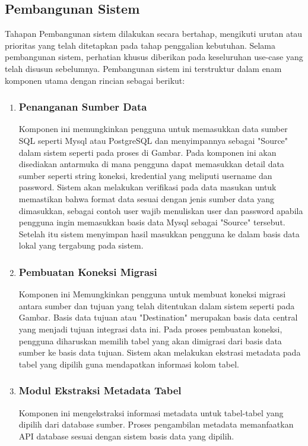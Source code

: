 \subsection{Pembangunan Sistem}
Tahapan Pembangunan sistem dilakukan secara bertahap, mengikuti urutan atau prioritas yang telah ditetapkan pada tahap penggalian kebutuhan. Selama pembangunan sistem, perhatian khusus diberikan pada keseluruhan use-case yang telah disusun sebelumnya. Pembangunan sistem ini terstruktur dalam enam komponen utama dengan rincian sebagai berikut:
\begin{enumerate}
  \item \subsubsection*{Penanganan Sumber Data}
  Komponen ini memungkinkan pengguna untuk memasukkan data sumber SQL seperti Mysql atau PostgreSQL dan menyimpannya sebagai "Source" dalam sistem seperti pada proses di Gambar. Pada komponen ini akan disediakan antarmuka di mana pengguna dapat memasukkan detail data sumber seperti string koneksi, kredential yang meliputi username dan password. Sistem akan melakukan verifikasi pada data masukan untuk memastikan bahwa format data sesuai dengan jenis sumber data yang dimasukkan, sebagai contoh user wajib menuliskan user dan password apabila pengguna ingin memasukkan basis data Mysql sebagai "Source" tersebut. Setelah itu sistem menyimpan hasil masukkan pengguna ke dalam basis data lokal yang tergabung pada sistem.
  \item \subsubsection*{Pembuatan Koneksi Migrasi}
  Komponen ini Memungkinkan pengguna untuk membuat koneksi migrasi antara sumber dan tujuan yang telah ditentukan dalam sistem seperti pada Gambar. Basis data tujuan atau "Destination" merupakan basis data central yang menjadi tujuan integrasi data ini. Pada proses pembuatan koneksi, pengguna diharuskan memilih tabel yang akan dimigrasi dari basis data sumber ke basis data tujuan. Sistem akan melakukan ekstrasi metadata pada tabel yang dipilih guna mendapatkan informasi kolom tabel.
  \item \subsubsection*{Modul Ekstraksi Metadata Tabel}
  Komponen ini mengekstraksi informasi metadata untuk tabel-tabel yang dipilih dari database sumber. Proses pengambilan metadata memanfaatkan API database sesuai dengan sistem basis data yang dipilih.

\end{enumerate}
